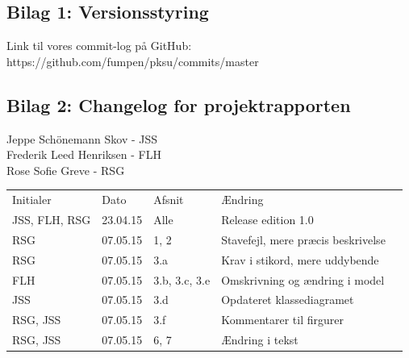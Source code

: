 \documentclass[12pt,a4paper]{article}
\begin{document}
\subsection{Bilag 1: Versionsstyring}
Link til vores commit-log på GitHub:\\
https://github.com/fumpen/pksu/commits/master
\subsection{Bilag 2: Changelog for projektrapporten}
Jeppe Schönemann Skov - JSS\\
Frederik Leed Henriksen - FLH\\
Rose Sofie Greve - RSG\\

\begin{table}[h]
\begin{tabular}{lllll}
\cline{1-4}
\multicolumn{1}{|l|}{Initialer} & \multicolumn{1}{l|}{Dato} & \multicolumn{1}{l|}{Afsnit} & \multicolumn{1}{l|}{Ændring} &  \\ \cline{1-4}
\multicolumn{1}{|l|}{JSS, FLH, RSG}     & \multicolumn{1}{l|}{23.04.15}     & \multicolumn{1}{l|}{Alle}       & \multicolumn{1}{l|}{Release edition 1.0}        &  \\ \cline{1-4}
\multicolumn{1}{|l|}{RSG}     & \multicolumn{1}{l|}{07.05.15}     & \multicolumn{1}{l|}{1, 2}       & \multicolumn{1}{l|}{Stavefejl, mere præcis beskrivelse}        &  \\ \cline{1-4}
\multicolumn{1}{|l|}{RSG}     & \multicolumn{1}{l|}{07.05.15}     & \multicolumn{1}{l|}{3.a}       & \multicolumn{1}{l|}{Krav i stikord, mere uddybende}        &  \\ \cline{1-4}
\multicolumn{1}{|l|}{FLH}     & \multicolumn{1}{l|}{07.05.15}     & \multicolumn{1}{l|}{3.b, 3.c, 3.e}       & \multicolumn{1}{l|}{Omskrivning og ændring i model}        &  \\ \cline{1-4}
\multicolumn{1}{|l|}{JSS}     & \multicolumn{1}{l|}{07.05.15}     & \multicolumn{1}{l|}{3.d}       & \multicolumn{1}{l|}{Opdateret klassediagramet}        &  \\ \cline{1-4}
\multicolumn{1}{|l|}{RSG, JSS}     & \multicolumn{1}{l|}{07.05.15}     & \multicolumn{1}{l|}{3.f}       & \multicolumn{1}{l|}{Kommentarer til firgurer}        &  \\ \cline{1-4}
\multicolumn{1}{|l|}{RSG, JSS}     & \multicolumn{1}{l|}{07.05.15}     & \multicolumn{1}{l|}{6, 7}       & \multicolumn{1}{l|}{Ændring i tekst}        &  \\ \cline{1-4}

\end{tabular}
\end{table}
\end{document}
